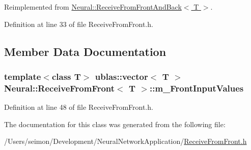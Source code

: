 Reimplemented from \hyperlink{class_neural_1_1_receive_from_front_and_back_af483f1dfff9288b62c4324f973ca917b}{Neural::ReceiveFromFrontAndBack$<$ T $>$}.



Definition at line 33 of file ReceiveFromFront.h.



\subsection{Member Data Documentation}
\hypertarget{class_neural_1_1_receive_from_front_a790fab8f7b2e277153de09ce3fe93d94}{
\subsubsection[{m\_\-FrontInputValues}]{\setlength{\rightskip}{0pt plus 5cm}template$<$class T$>$ ublas::vector$<$ T $>$ {\bf Neural::ReceiveFromFront}$<$ T $>$::{\bf m\_\-FrontInputValues}}}
\label{class_neural_1_1_receive_from_front_a790fab8f7b2e277153de09ce3fe93d94}


Definition at line 48 of file ReceiveFromFront.h.



The documentation for this class was generated from the following file:\begin{DoxyCompactItemize}
\item 
/Users/seimon/Development/NeuralNetworkApplication/\hyperlink{_receive_from_front_8h}{ReceiveFromFront.h}\end{DoxyCompactItemize}
